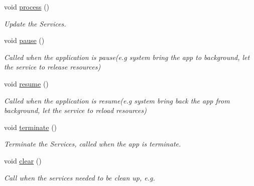\begin{DoxyCompactItemize}
\item 
void \hyperlink{class_i_dream_sky_1_1_scene_1_1_factory_ac6a15b3af44e3f3bd58a497c5123378d}{process} ()\hypertarget{class_i_dream_sky_1_1_scene_1_1_factory_ac6a15b3af44e3f3bd58a497c5123378d}{}\label{class_i_dream_sky_1_1_scene_1_1_factory_ac6a15b3af44e3f3bd58a497c5123378d}

\begin{DoxyCompactList}\small\item\em Update the Services. \end{DoxyCompactList}\item 
void \hyperlink{class_i_dream_sky_1_1_scene_1_1_factory_ae0fa7f6a0b0ec4cb91a0ae4ad3a6beb0}{pause} ()\hypertarget{class_i_dream_sky_1_1_scene_1_1_factory_ae0fa7f6a0b0ec4cb91a0ae4ad3a6beb0}{}\label{class_i_dream_sky_1_1_scene_1_1_factory_ae0fa7f6a0b0ec4cb91a0ae4ad3a6beb0}

\begin{DoxyCompactList}\small\item\em Called when the application is pause(e.\+g system bring the app to background, let the service to release resources) \end{DoxyCompactList}\item 
void \hyperlink{class_i_dream_sky_1_1_scene_1_1_factory_a989d01f9c75f8667a160ca9900820ad9}{resume} ()\hypertarget{class_i_dream_sky_1_1_scene_1_1_factory_a989d01f9c75f8667a160ca9900820ad9}{}\label{class_i_dream_sky_1_1_scene_1_1_factory_a989d01f9c75f8667a160ca9900820ad9}

\begin{DoxyCompactList}\small\item\em Called when the application is resume(e.\+g system bring back the app from background, let the service to reload resources) \end{DoxyCompactList}\item 
void \hyperlink{class_i_dream_sky_1_1_scene_1_1_factory_a9290a74d918072b2756a396ef237ee4a}{terminate} ()\hypertarget{class_i_dream_sky_1_1_scene_1_1_factory_a9290a74d918072b2756a396ef237ee4a}{}\label{class_i_dream_sky_1_1_scene_1_1_factory_a9290a74d918072b2756a396ef237ee4a}

\begin{DoxyCompactList}\small\item\em Terminate the Services, called when the app is terminate. \end{DoxyCompactList}\item 
void \hyperlink{class_i_dream_sky_1_1_scene_1_1_factory_ac5d57a49fc5c883c175e00f35b1517ea}{clear} ()
\begin{DoxyCompactList}\small\item\em Call when the services needed to be clean up, e.\+g. \end{DoxyCompactList}\end{DoxyCompactItemize}
